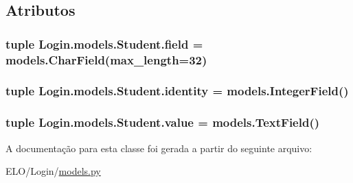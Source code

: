 \subsection{Atributos}
\hypertarget{classLogin_1_1models_1_1Student_a85f47825471508e73b87763b312ee774}{
\subsubsection[{field}]{\setlength{\rightskip}{0pt plus 5cm}tuple Login.\-models.\-Student.\-field = models.\-Char\-Field(max\-\_\-length=32)\hspace{0.3cm}{\ttfamily [static]}}}\label{d9/d70/classLogin_1_1models_1_1Student_a85f47825471508e73b87763b312ee774}
\hypertarget{classLogin_1_1models_1_1Student_a1e24367791c8f045c32b0694c55a553f}{
\subsubsection[{identity}]{\setlength{\rightskip}{0pt plus 5cm}tuple Login.\-models.\-Student.\-identity = models.\-Integer\-Field()\hspace{0.3cm}{\ttfamily [static]}}}\label{d9/d70/classLogin_1_1models_1_1Student_a1e24367791c8f045c32b0694c55a553f}
\hypertarget{classLogin_1_1models_1_1Student_ac98a87f107f696743b68fcc82dc87980}{
\subsubsection[{value}]{\setlength{\rightskip}{0pt plus 5cm}tuple Login.\-models.\-Student.\-value = models.\-Text\-Field()\hspace{0.3cm}{\ttfamily [static]}}}\label{d9/d70/classLogin_1_1models_1_1Student_ac98a87f107f696743b68fcc82dc87980}


A documentação para esta classe foi gerada a partir do seguinte arquivo\-:\begin{DoxyCompactItemize}
\item 
E\-L\-O/\-Login/\hyperlink{Login_2models_8py}{models.\-py}\end{DoxyCompactItemize}
